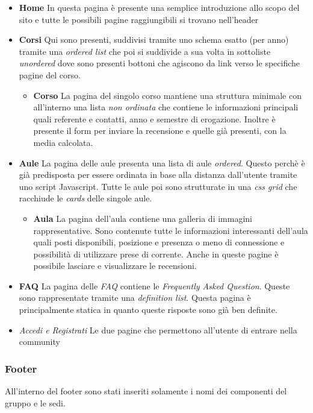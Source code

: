\begin{itemize}
    \item \textbf{Home} In questa pagina è presente una semplice introduzione allo scopo del sito e tutte le possibili pagine raggiungibili si trovano nell'header
    \item \textbf{Corsi} Qui sono presenti, suddivisi tramite uno schema esatto (per anno) tramite una \textit{ordered list} che poi si suddivide a sua volta in sottoliste \textit{unordered} dove sono presenti bottoni che agiscono da link verso le specifiche pagine del corso.
    \begin{itemize}
        \item \textbf{Corso} La pagina del singolo corso mantiene una struttura minimale con all'interno una lista \textit{non ordinata} che contiene le informazioni principali quali referente e contatti, anno e semestre di erogazione. Inoltre è presente il form per inviare la recensione e quelle già presenti, con la media calcolata.
    \end{itemize}
    \item \textbf{Aule} La pagina delle aule presenta una lista di aule \textit{ordered}. Questo perchè è già predisposta per essere ordinata in base alla distanza dall'utente tramite uno script Javascript. Tutte le aule poi sono strutturate in una \textit{css grid} che racchiude le \textit{cards} delle singole aule.
    \begin{itemize}
        \item \textbf{Aula} La pagina dell'aula contiene una galleria di immagini rappresentative. Sono contenute tutte le informazioni interessanti dell'aula quali posti disponibili, posizione e presenza o meno di connessione e possibilità di utilizzare prese di corrente. Anche in queste pagine è possibile lasciare e visualizzare le recensioni.
    \end{itemize}
    \item \textbf{FAQ} La pagina delle \textit{FAQ} contiene le \textit{Frequently Asked Question}. Queste sono rappresentate tramite una \textit{definition list}. Questa pagina è principalmente statica in quanto queste risposte sono già ben definite.
    \item \textit{Accedi e Registrati} Le due pagine che permettono all'utente di entrare nella community 
\end{itemize}
\subsubsection{Footer}
All'interno del footer sono stati inseriti solamente i nomi dei componenti del gruppo e le sedi.
